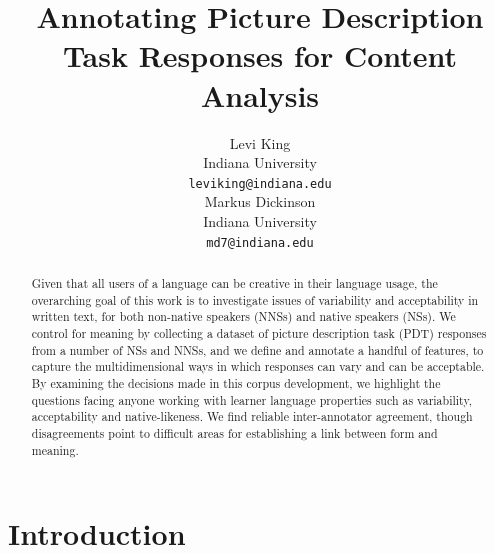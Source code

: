 \documentclass[11pt,a4paper]{article}
\title{Annotating Picture Description Task Responses for Content Analysis}
\author{Levi King \\
  Indiana University \\
  {\tt leviking@indiana.edu} \\\And
  Markus Dickinson \\
  Indiana University \\
  {\tt md7@indiana.edu} \\}
\date{}
\begin{document}
\maketitle
\begin{abstract}
Given that all users of a language can be creative in their language usage, the overarching goal of this work is to investigate issues of variability and acceptability in written text, for both non-native speakers (NNSs) and native speakers (NSs).  We control for meaning by collecting a dataset of picture description task (PDT) responses from a number of NSs and NNSs, and we define and annotate a handful of features, to capture the multidimensional ways in which responses can vary and can be acceptable.  By examining the decisions made in this corpus development, we highlight the questions facing anyone working with learner language properties such as variability, acceptability and native-likeness.  We find reliable inter-annotator agreement, though disagreements point to difficult areas for establishing a link between form and meaning.
\end{abstract}

\section{Introduction}



\end{document}
